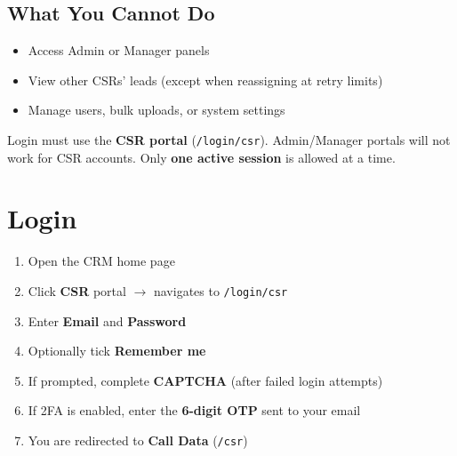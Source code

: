 \documentclass[11pt,a4paper]{article}
\begin{document}
\subsection{What You Cannot Do}
\begin{itemize}[noitemsep]
    \item Access Admin or Manager panels
    \item View other CSRs' leads (except when reassigning at retry limits)
    \item Manage users, bulk uploads, or system settings
\end{itemize}

\begin{warningbox}
Login must use the \textbf{CSR portal} (\texttt{/login/csr}). Admin/Manager portals will not work for CSR accounts. Only \textbf{one active session} is allowed at a time.
\end{warningbox}

\section{Login}

\begin{workflowbox}
\begin{enumerate}[noitemsep]
    \item Open the CRM home page
    \item Click \textbf{CSR} portal $\rightarrow$ navigates to \texttt{/login/csr}
    \item Enter \textbf{Email} and \textbf{Password}
    \item Optionally tick \textbf{Remember me}
    \item If prompted, complete \textbf{CAPTCHA} (after failed login attempts)
    \item If 2FA is enabled, enter the \textbf{6-digit OTP} sent to your email
    \item You are redirected to \textbf{Call Data} (\texttt{/csr})
\end{enumerate}
\end{workflowbox}


\end{document}
